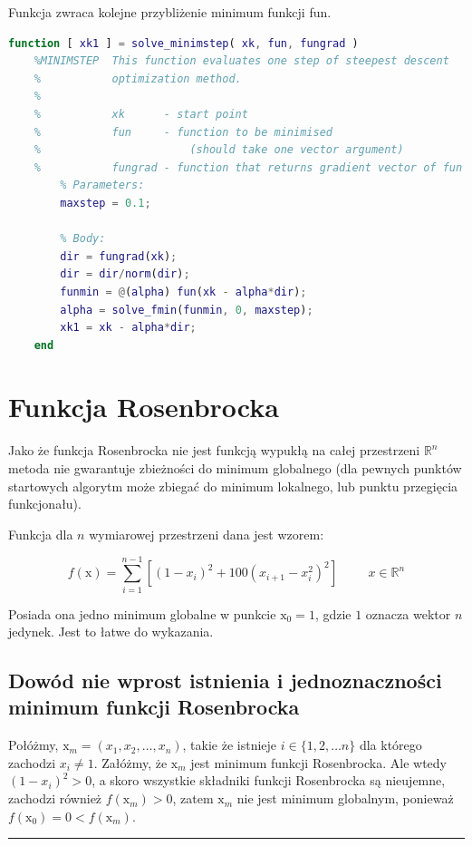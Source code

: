 \documentclass[12pt]{article}
\begin{document}
Funkcja zwraca kolejne przybliżenie minimum funkcji fun.

\begin{lstlisting}[language=MATLAB, style=mystyle]
    function [ xk1 ] = solve_minimstep( xk, fun, fungrad )
    %MINIMSTEP  This function evaluates one step of steepest descent
    %           optimization method.
    %
    %           xk      - start point
    %           fun     - function to be minimised
    %                       (should take one vector argument)
    %           fungrad - function that returns gradient vector of fun
        % Parameters:
        maxstep = 0.1;
    
        % Body:
        dir = fungrad(xk);
        dir = dir/norm(dir);
        funmin = @(alpha) fun(xk - alpha*dir);
        alpha = solve_fmin(funmin, 0, maxstep);
        xk1 = xk - alpha*dir;
    end
\end{lstlisting}

\newpage

\section*{Funkcja Rosenbrocka}

Jako że funkcja Rosenbrocka nie jest funkcją wypukłą na całej przestrzeni
$\mathbb{R}^{n}$ metoda nie gwarantuje zbieżności do minimum globalnego (dla
pewnych punktów startowych algorytm może zbiegać do minimum lokalnego, lub
punktu przegięcia funkcjonału).

Funkcja dla $n$ wymiarowej przestrzeni dana jest wzorem:

\begin{equation}
    f(\mathrm{x}) = \sum^{n-1}_{i=1} \left[(1-x_i)^2 + 100(x_{i+1} -
    x_i^2)^2\right] \hspace{1cm} x \in \mathbb{R}^n
\end{equation}

Posiada ona jedno minimum globalne w punkcie
$\mathrm{x}_0 = \textrm{1}$, gdzie $1$ oznacza wektor $n$ jedynek. Jest to
łatwe do wykazania.

\subsection*{Dowód nie wprost istnienia i jednoznaczności minimum funkcji
Rosenbrocka}

Połóżmy, $\mathrm{x}_m = (x_1, x_2, \ldots, x_n)$, takie że istnieje $i \in
\{1,2,\ldots n\}$ dla którego zachodzi $x_i \neq 1$. Załóżmy, że $\mathrm{x}_m$
jest minimum funkcji Rosenbrocka. Ale wtedy $(1-x_i)^2 > 0$, a skoro wszystkie
składniki funkcji Rosenbrocka są nieujemne, zachodzi również $f(\mathrm{x}_m) >
0$, zatem $\mathrm{x}_m$ nie jest minimum globalnym, ponieważ $f(\mathrm{x}_0)
= 0 < f(\mathrm{x}_m)$.\\ \rule{1ex}{1ex}
\end{document}
